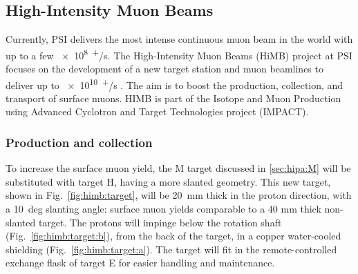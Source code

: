 \begin{refsection}
    \subsection{High-Intensity Muon Beams}
        Currently, PSI delivers the most intense continuous muon beam in the world with up to a few \SI{e8}{\upmu^+/s}.
        The High-Intensity Muon Beams (HiMB) project at PSI focuses on the development of a new target station and muon beamlines to deliver up to \SI{e10}{\upmu^+/s} \cite{HIMB:2021}\cite{HIMB:gio}.
        The aim is to boost the production, collection, and transport of surface muons.
        HIMB is part of the  Isotope and Muon Production using Advanced Cyclotron and Target Technologies project (IMPACT)\cite{impact}.

        \subsubsection{Production and collection}
        To increase the surface muon yield, the M target discussed in \ref{sec:hipa:M} will be substituted with target H, having a more slanted geometry.
        This new target, shown in Fig.~\ref{fig:himb:target}, will be \SI{20}{mm} thick in the proton direction, with a \SI{10}{deg} slanting angle: surface muon yields comparable to a 40 mm thick non-slanted target. 
        The protons will impinge below the rotation shaft (Fig.~\ref{fig:himb:target:b}), from the back of the target, in a copper water-cooled shielding (Fig.~\ref{fig:himb:target:a}).
        The target will fit in the remote-controlled exchange flask of target E for easier handling and maintenance.
        \begin{figure}
            \centering
\end{figure}
\end{refsection}
